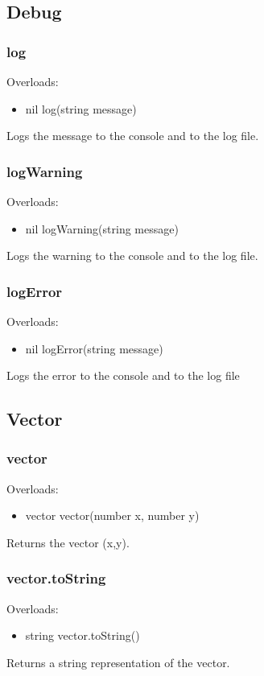 \documentclass{book}
\newenvironment{ulist}
	{\begin{itemize}
			\itemsep0em}
	{\end{itemize}}
\begin{document}
\subsection{Debug}
\subsubsection{log}
Overloads:
\begin{ulist}
	\item nil log(string message)
\end{ulist}
Logs the message to the console and to the log file.

\subsubsection{logWarning}
Overloads:
\begin{ulist}
	\item nil logWarning(string message)
\end{ulist}
Logs the warning to the console and to the log file.

\subsubsection{logError}
Overloads:
\begin{ulist}
	\item nil logError(string message)
\end{ulist}
Logs the error to the console and to the log file

\subsection{Vector}
\subsubsection{vector}
Overloads:
\begin{ulist}
	\item vector vector(number x, number y)
\end{ulist}
Returns the vector (x,y).

\subsubsection{vector.toString}
Overloads:
\begin{ulist}
	\item string vector.toString()
\end{ulist}
Returns a string representation of the vector.
\end{document}
